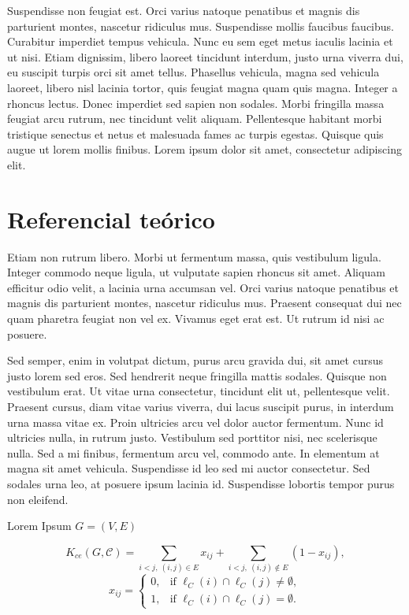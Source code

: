 \documentclass[superscriptaddress,a0]{sciposter}
\begin{document}
\begin{multicols}{3}
Suspendisse non feugiat est. Orci varius natoque penatibus et magnis dis parturient montes, nascetur ridiculus mus. Suspendisse mollis faucibus faucibus. Curabitur imperdiet tempus vehicula. Nunc eu sem eget metus iaculis lacinia et ut nisi. Etiam dignissim, libero laoreet tincidunt interdum, justo urna viverra dui, eu suscipit turpis orci sit amet tellus. Phasellus vehicula, magna sed vehicula laoreet, libero nisl lacinia tortor, quis feugiat magna quam quis magna. Integer a rhoncus lectus. Donec imperdiet sed sapien non sodales. Morbi fringilla massa feugiat arcu rutrum, nec tincidunt velit aliquam. Pellentesque habitant morbi tristique senectus et netus et malesuada fames ac turpis egestas. Quisque quis augue ut lorem mollis finibus. Lorem ipsum dolor sit amet, consectetur adipiscing elit.

\section{Referencial teórico}

Etiam non rutrum libero. Morbi ut fermentum massa, quis vestibulum ligula. Integer commodo neque ligula, ut vulputate sapien rhoncus sit amet. Aliquam efficitur odio velit, a lacinia urna accumsan vel. Orci varius natoque penatibus et magnis dis parturient montes, nascetur ridiculus mus. Praesent consequat dui nec quam pharetra feugiat non vel ex. Vivamus eget erat est. Ut rutrum id nisi ac posuere.

Sed semper, enim in volutpat dictum, purus arcu gravida dui, sit amet cursus justo lorem sed eros. Sed hendrerit neque fringilla mattis sodales. Quisque non vestibulum erat. Ut vitae urna consectetur, tincidunt elit ut, pellentesque velit. Praesent cursus, diam vitae varius viverra, dui lacus suscipit purus, in interdum urna massa vitae ex. Proin ultricies arcu vel dolor auctor fermentum. Nunc id ultricies nulla, in rutrum justo. Vestibulum sed porttitor nisi, nec scelerisque nulla. Sed a mi finibus, fermentum arcu vel, commodo ante. In elementum at magna sit amet vehicula. Suspendisse id leo sed mi auctor consectetur. Sed sodales urna leo, at posuere ipsum lacinia id. Suspendisse lobortis tempor purus non eleifend.

    Lorem Ipsum $G = (V,E)$
    
  \begin{equation}
  \label{eq:lip_cc_of}
   K_{ce}(G, \mathcal{C}) = \sum\limits_{i < j, \ (i,j) \in E} x_{ij} +
      \sum\limits_{i < j, \ (i,j) \notin E} (1 - x_{ij}),
  \end{equation}
  \[
    x_{ij} = 
    \begin{cases}
            0, & \text{if } \ell_C(i) \cap \ell_C(j) \neq \emptyset,\\
            1, & \text{if } \ell_C(i) \cap \ell_C(j) = \emptyset.
    \end{cases}
  \]


\end{multicols}
\end{document}

